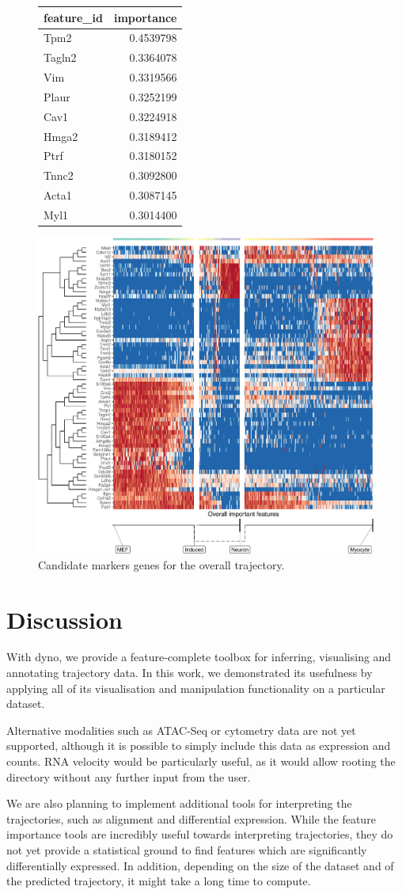 \begin{figure}
\hfill
	{\footnotesize
\begin{tabular}{lr}
\toprule
feature\_id & importance\\
\midrule
Tpm2 & 0.4539798\\
Tagln2 & 0.3364078\\
Vim & 0.3319566\\
Plaur & 0.3252199\\
Cav1 & 0.3224918\\
\addlinespace
Hmga2 & 0.3189412\\
Ptrf & 0.3180152\\
Tnnc2 & 0.3092800\\
Acta1 & 0.3087145\\
Myl1 & 0.3014400\\
\bottomrule
\end{tabular}
}\hfill
\includegraphics[width=.6\linewidth,valign=m]{manuscript_files/figure-latex/overallheatmap-1.pdf}
\caption{Candidate markers genes for the overall trajectory.}
\label{fig:fimp_over}
\end{figure}





\section{Discussion}
With {dyno}, we provide a feature-complete toolbox for inferring, visualising and annotating trajectory data. In this work, we demonstrated its usefulness by applying all of its visualisation and manipulation functionality on a particular dataset.

Alternative modalities such as ATAC-Seq or cytometry data are not yet
supported, although it is possible to simply include this data as
expression and counts.
RNA velocity \cite{lamanno_rnavelocitysingle_2018} would be particularly useful, as it would allow
rooting the directory without any further input from the user.

We are also planning to implement additional tools for interpreting the trajectories, such as alignment and differential expression. While the feature importance tools are incredibly useful towards interpreting trajectories, they do not yet provide a statistical ground to find features which are significantly
differentially expressed. In addition, depending on the size of the
dataset and of the predicted trajectory, it might take a long time to
compute.



